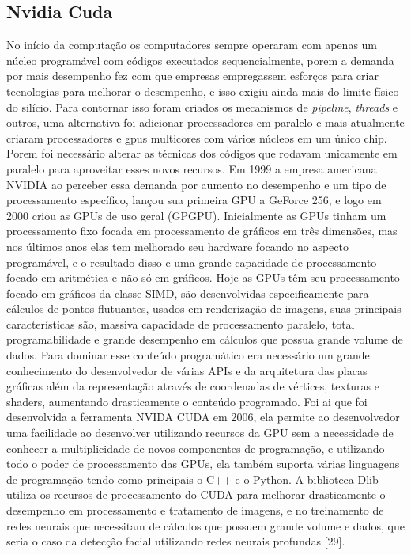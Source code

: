 \subsection{Nvidia Cuda}
No início da computação os computadores sempre operaram com apenas um núcleo programável com códigos executados sequencialmente, porem a demanda por mais desempenho fez com que empresas empregassem esforços para criar tecnologias para melhorar o desempenho, e isso exigiu ainda mais do limite físico do silício. Para contornar isso foram criados os mecanismos de \textit{pipeline}, \textit{threads} e outros, uma alternativa foi adicionar processadores em paralelo e mais atualmente criaram processadores e gpus multicores com vários núcleos em um único chip. Porem foi necessário alterar as técnicas dos códigos que rodavam unicamente em paralelo para aproveitar esses novos recursos.
Em 1999 a empresa americana NVIDIA ao perceber essa demanda por aumento no desempenho e um tipo de processamento específico, lançou sua primeira GPU a GeForce 256, e logo em 2000 criou as GPUs de uso geral (GPGPU).
Inicialmente as GPUs tinham um processamento fixo focada em processamento de gráficos em três dimensões, mas nos últimos anos elas tem melhorado seu hardware focando no aspecto programável, e o resultado disso e uma grande capacidade de processamento focado em aritmética e não só em gráficos.
Hoje as GPUs têm seu processamento focado em gráficos da classe SIMD, são desenvolvidas especificamente para cálculos de pontos flutuantes, usados em renderização de imagens, suas principais características são, massiva capacidade de processamento paralelo, total programabilidade e grande desempenho em cálculos que possua grande volume de dados. Para dominar esse conteúdo programático era necessário um grande conhecimento do desenvolvedor de várias APIs e da arquitetura das placas gráficas além da representação através de coordenadas de vértices, texturas e shaders, aumentando drasticamente o conteúdo programado.
Foi ai que foi desenvolvida a ferramenta NVIDA CUDA em 2006, ela permite ao desenvolvedor uma facilidade ao desenvolver utilizando recursos da GPU sem a necessidade de conhecer a multiplicidade de novos componentes de programação, e utilizando todo o poder de processamento das GPUs, ela também suporta várias linguagens de programação tendo como principais o C++ e o Python.
A biblioteca Dlib utiliza os recursos de processamento do CUDA para melhorar drasticamente o desempenho em processamento e tratamento de imagens, e no treinamento de redes neurais que necessitam de cálculos que possuem grande volume e dados, que seria o caso da detecção facial utilizando redes neurais profundas [29].

